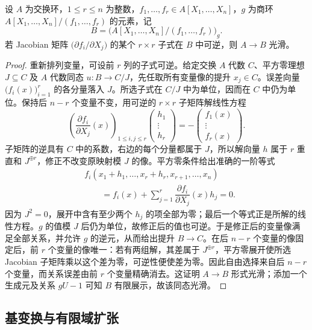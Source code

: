 \begin{proposition}\label{b3:prop:jacobian-smooth-lifting}
	设 \(A\) 为交换环，\(1\le r\le n\) 为整数，\(f_1,\ldots,f_r\in A[X_1,\ldots,X_n]\)，\(g\) 为商环 \(A[X_1,\ldots,X_n]/(f_1,\ldots,f_r)\) 的元素，记
	\[
		B=\bigl(A[X_1,\ldots,X_n]/(f_1,\ldots,f_r)\bigr)_g.
	\]
	若 Jacobian 矩阵 \(\bigl(\partial f_i/\partial X_j\bigr)\) 的某个 \(r\times r\) 子式在 \(B\) 中可逆，则 \(A\to B\) 光滑。
\end{proposition}
\begin{proof}
	重新排列变量，可设前 \(r\) 列的子式可逆。给定交换 \(A\) 代数 \(C\)、平方零理想 \(J\subseteq C\) 及 \(A\) 代数同态 \(u:B\to C/J\)，先任取所有变量像的提升 \(x_j\in C\)。误差向量 \(\bigl(f_i(x)\bigr)_{i=1}^r\) 的各分量落入 \(J\)。所选子式在 \(C/J\) 中为单位，因而在 \(C\) 中仍为单位。保持后 \(n-r\) 个变量不变，用可逆的 \(r\times r\) 子矩阵解线性方程
	\[
		\left(\dfrac{\partial f_i}{\partial X_j}(x)\right)_{1\le i,j\le r}
		\begin{pmatrix}h_1\\ \vdots\\h_r\end{pmatrix}
		=-\begin{pmatrix}f_1(x)\\ \vdots\\f_r(x)\end{pmatrix}.
	\]
	子矩阵的逆具有 \(C\) 中的系数，右边的每个分量都属于 \(J\)，所以解向量 \(h\) 属于 \(r\) 重直和 \(J^{\oplus r}\)，修正不改变原映射模 \(J\) 的像。平方零条件给出准确的一阶等式
	\[
		\begin{aligned}
			&f_i(x_1+h_1,\ldots,x_r+h_r,x_{r+1},\ldots,x_n)\\
			&\qquad=f_i(x)+\sum_{j=1}^r \dfrac{\partial f_i}{\partial X_j}(x)h_j=0.
		\end{aligned}
	\]
	因为 \(J^2=0\)，展开中含有至少两个 \(h_j\) 的项全部为零；最后一个等式正是所解的线性方程。\(g\) 的值模 \(J\) 后仍为单位，故修正后的值也可逆。于是修正后的变量像满足全部关系，并允许 \(g\) 的逆元，从而给出提升 \(B\to C\)。在后 \(n-r\) 个变量的像固定后，前 \(r\) 个变量的像唯一：若有两组解，其差属于 \(J^{\oplus r}\)，平方零展开使所选 Jacobian 子矩阵乘以这个差为零，可逆性便使差为零。因此自由选择来自后 \(n-r\) 个变量，而关系误差由前 \(r\) 个变量精确消去。这证明 \(A\to B\) 形式光滑；添加一个生成元及关系 \(gU-1\) 可知 \(B\) 有限展示，故该同态光滑。
\end{proof}

\subsection{基变换与有限域扩张}
\label{b3:subsec:1405:04}

